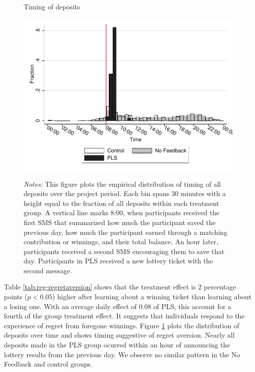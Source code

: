 \documentclass[11pt]{article}
\begin{document}

		\begin{figure}[ht]
		\centering
		\caption{Timing of deposits}
		\includegraphics[width=\textwidth]{../../figures/hist-deposits.pdf}
		\label{fig:hist-deposits}
		\caption*{\footnotesize \emph{Notes:} This figure plots the empirical distribution of timing of all deposits over the project period. Each bin spans 30 minutes with a height equal to the fraction of all deposits within each treatment group. A vertical line marks 8:00, when participants received the first SMS that summarized how much the participant saved the previous day, how much the participant earned through a matching contribution or winnings, and their total balance. An hour later, participants received a second SMS encouraging them to save that day. Participants in PLS received a new lottery ticket with the second message.}
		\end{figure}

		Table \ref{tab:reg-regretaversion} shows that the treatment effect is 2 percentage points ($p<0.05$) higher after learning about a winning ticket than learning about a losing one. With an average daily effect of 0.08 of PLS, this account for a fourth of the group treatment effect. It suggests that individuals respond to the experience of regret from foregone winnings. Figure \ref{fig:hist-deposits} plots the distribution of deposits over time and shows timing suggestive of regret aversion. Nearly all deposits made in the PLS group ocurred within an hour of announcing the lottery results from the previous day. We observe no similar pattern in the No Feedback and control groups.
\end{document}
